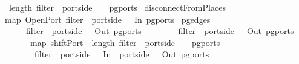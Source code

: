 \ length\ {\isacharparenleft}filter\ {\isacharparenleft}{\isasymlambda}\ port{\isachardot}side\ \ {\isacharequal}\ \ {\isacharparenleft}pg{\isacharunderscore}ports\ \isanewline
{}disconnectFromPlaces\isanewline
{}map\ OpenPort\ {\isacharparenleft}filter\ {\isacharparenleft}{\isasymlambda}\ port{\isachardot}side\ \ {\isacharequal}\ In{\isacharparenright}\ {\isacharparenleft}pg{\isacharunderscore}ports\ \isanewline
{}pg{\isacharunderscore}edges\ \isanewline
\ \ \ \ {\isacharparenleft}\ filter\ {\isacharparenleft}{\isasymlambda}\ port{\isachardot}side\ \ {\isasymnoteq}\ Out{\isacharparenright}\ {\isacharparenleft}pg{\isacharunderscore}ports\ \ {\isacharat}\isanewline
\ \ \ \ \ \ filter\ {\isacharparenleft}{\isasymlambda}\ port{\isachardot}side\ \ {\isacharequal}\ Out{\isacharparenright}\ {\isacharparenleft}pg{\isacharunderscore}ports\ \ {\isacharat}\isanewline
\ \ \ \ \ \ map\ {\isacharparenleft}shiftPort\ {\isacharparenleft}{\isasymlambda}\ length\ {\isacharparenleft}filter\ {\isacharparenleft}{\isasymlambda}\ port{\isachardot}side\ \ {\isacharequal}\ \ {\isacharparenleft}pg{\isacharunderscore}ports\ \isanewline
\ \ \ \ \ \ \ {\isacharparenleft}filter\ {\isacharparenleft}{\isasymlambda}\ port{\isachardot}side\ \ {\isasymnoteq}\ In\ {\isasymand}\ port{\isachardot}side\ \ {\isasymnoteq}\ Out{\isacharparenright}\ {\isacharparenleft}pg{\isacharunderscore}ports\ %
